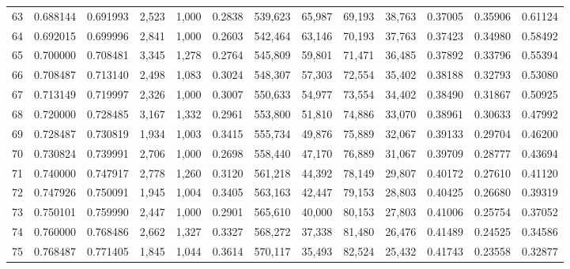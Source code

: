 \begin{tabular}{rrrrrrrrrrrrr}
63 &  0.688144 &  0.691993 &   2,523 &  1,000 &                                     0.2838 &  539,623 &   65,987 &   69,193 &   38,763 &  0.37005 &  0.35906 &  0.61124 \\
64 &  0.692015 &  0.699996 &   2,841 &  1,000 &                                     0.2603 &  542,464 &   63,146 &   70,193 &   37,763 &  0.37423 &  0.34980 &  0.58492 \\
65 &  0.700000 &  0.708481 &   3,345 &  1,278 &                                     0.2764 &  545,809 &   59,801 &   71,471 &   36,485 &  0.37892 &  0.33796 &  0.55394 \\
66 &  0.708487 &  0.713140 &   2,498 &  1,083 &                                     0.3024 &  548,307 &   57,303 &   72,554 &   35,402 &  0.38188 &  0.32793 &  0.53080 \\
67 &  0.713149 &  0.719997 &   2,326 &  1,000 &                                     0.3007 &  550,633 &   54,977 &   73,554 &   34,402 &  0.38490 &  0.31867 &  0.50925 \\
68 &  0.720000 &  0.728485 &   3,167 &  1,332 &                                     0.2961 &  553,800 &   51,810 &   74,886 &   33,070 &  0.38961 &  0.30633 &  0.47992 \\
69 &  0.728487 &  0.730819 &   1,934 &  1,003 &                                     0.3415 &  555,734 &   49,876 &   75,889 &   32,067 &  0.39133 &  0.29704 &  0.46200 \\
70 &  0.730824 &  0.739991 &   2,706 &  1,000 &                                     0.2698 &  558,440 &   47,170 &   76,889 &   31,067 &  0.39709 &  0.28777 &  0.43694 \\
71 &  0.740000 &  0.747917 &   2,778 &  1,260 &                                     0.3120 &  561,218 &   44,392 &   78,149 &   29,807 &  0.40172 &  0.27610 &  0.41120 \\
72 &  0.747926 &  0.750091 &   1,945 &  1,004 &                                     0.3405 &  563,163 &   42,447 &   79,153 &   28,803 &  0.40425 &  0.26680 &  0.39319 \\
73 &  0.750101 &  0.759990 &   2,447 &  1,000 &                                     0.2901 &  565,610 &   40,000 &   80,153 &   27,803 &  0.41006 &  0.25754 &  0.37052 \\
74 &  0.760000 &  0.768486 &   2,662 &  1,327 &                                     0.3327 &  568,272 &   37,338 &   81,480 &   26,476 &  0.41489 &  0.24525 &  0.34586 \\
75 &  0.768487 &  0.771405 &   1,845 &  1,044 &                                     0.3614 &  570,117 &   35,493 &   82,524 &   25,432 &  0.41743 &  0.23558 &  0.32877 \\

\end{tabular}
